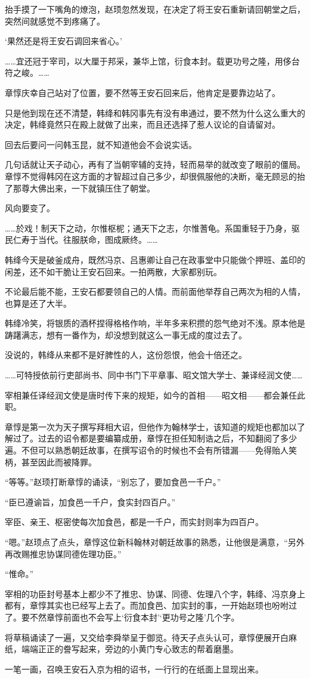 抬手摸了一下嘴角的燎泡，赵顼忽然发现，在决定了将王安石重新请回朝堂之后，突然间就感觉不到疼痛了。

‘果然还是将王安石调回来省心。’

……宜还冠于宰司，以大厘于邦采，兼华上馆，衍食本封。载更功号之隆，用侈台符之峻。……

章惇庆幸自己站对了位置，要不然等王安石回来后，他肯定是要靠边站了。

只是他到现在还不清楚，韩绛和韩冈事先有没有串通过，要不然为什么这么重大的决定，韩绛竟然只在殿上就做了出来，而且还选择了惹人议论的自请留对。

回去后要问一问韩玉昆，就不知道他会不会说实话。

几句话就让天子动心，再有了当朝宰辅的支持，轻而易举的就改变了眼前的僵局。章惇不觉得韩冈在这方面的才智超过自己多少，却很佩服他的决断，毫无顾忌的抬了那尊大佛出来，一下就镇压住了朝堂。

风向要变了。

……於戏！制天下之动，尔惟枢柅；通天下之志，尔惟蓍龟。系国重轻于乃身，驱民仁寿于当代。往服朕命，图成厥终。……

韩绛今天是破釜成舟，既然冯京、吕惠卿让自己在政事堂中只能做个押班、盖印的闲差，还不如干脆让王安石回来。一拍两散，大家都别玩。

不论最后能不能，王安石都要领自己的人情。而前面他举荐自己两次为相的人情，也算是还了大半。

韩绛冷笑，将银质的酒杯捏得格格作响，半年多来积攒的怨气绝对不浅。原本他是踌躇满志，想有一番作为，却没想到就这么一事无成的度过去了。

没说的，韩绛从来都不是好脾性的人，这份怨恨，他会十倍还之。

……可特授依前行吏部尚书、同中书门下平章事、昭文馆大学士、兼译经润文使……

宰相兼任译经润文使是唐时传下来的规矩，如今的首相——昭文相——都会兼任此职。

章惇是第一次为天子撰写拜相大诏，但他作为翰林学士，该知道的规矩也都加以了解过了。过去的诏令都是要编纂成册，章惇在担任知制诰之后，不知翻阅了多少遍。不但可以熟悉朝廷故事，在撰写诏令的时候也不会有所错漏——免得贻人笑柄，甚至因此而被降罪。

“等等。”赵顼打断章惇的诵读，“别忘了，要加食邑一千户。”

“臣已遵谕旨，加食邑一千户，食实封四百户。”

宰臣、亲王、枢密使每次加食邑，都是一千户，而实封则率为四百户。

“嗯。”赵顼点了点头，章惇这位新科翰林对朝廷故事的熟悉，让他很是满意，“另外再改赐推忠协谋同德佐理功臣。”

“惟命。”

宰相的功臣封号基本上都少不了推忠、协谋、同德、佐理八个字，韩绛、冯京身上都有，章惇其实也已经写上去了。而加食邑、加实封的事，一开始赵顼也吩咐过了。要不然章惇前面也不会写上‘衍食本封’‘更功号之隆’几个字。

将草稿诵读了一遍，又交给李舜举呈于御览。待天子点头认可，章惇便展开白麻纸，端端正正的誊写起来，旁边的小黄门专心致志的帮着磨墨。

一笔一画，召唤王安石入京为相的诏书，一行行的在纸面上显现出来。

